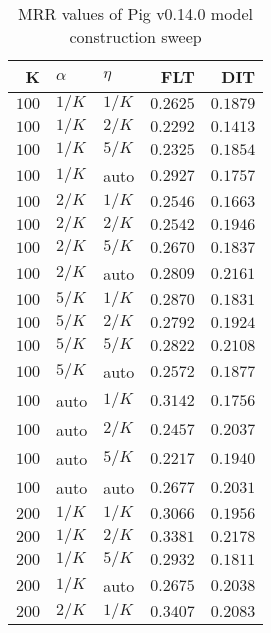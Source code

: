 
\begin{table}
\begin{spacing}{1.2}
\centering
\caption{MRR values of Pig v0.14.0 model construction sweep}
\label{table:pig_model_sweep}
\vspace{0.2em}
\parbox{.45\linewidth}{\centering \begin{tabular}{rll|rr}
\toprule
    K &  $\alpha$ &    $\eta$ & FLT &        DIT \\
\midrule
$100$ &  $1/K$ &  $1/K$ &         $0.2625$ &      $0.1879$ \\
$100$ &  $1/K$ &  $2/K$ &         $0.2292$ &      $0.1413$ \\
$100$ &  $1/K$ &  $5/K$ &         $0.2325$ &      $0.1854$ \\
$100$ &  $1/K$ &   auto &         $0.2927$ &      $0.1757$ \\
$100$ &  $2/K$ &  $1/K$ &         $0.2546$ &      $0.1663$ \\
$100$ &  $2/K$ &  $2/K$ &         $0.2542$ &      $0.1946$ \\
$100$ &  $2/K$ &  $5/K$ &         $0.2670$ &      $0.1837$ \\
$100$ &  $2/K$ &   auto &         $0.2809$ &      $0.2161$ \\
$100$ &  $5/K$ &  $1/K$ &         $0.2870$ &      $0.1831$ \\
$100$ &  $5/K$ &  $2/K$ &         $0.2792$ &      $0.1924$ \\
$100$ &  $5/K$ &  $5/K$ &         $0.2822$ &      $0.2108$ \\
$100$ &  $5/K$ &   auto &         $0.2572$ &      $0.1877$ \\
$100$ &   auto &  $1/K$ &         $0.3142$ &      $0.1756$ \\
$100$ &   auto &  $2/K$ &         $0.2457$ &      $0.2037$ \\
$100$ &   auto &  $5/K$ &         $0.2217$ &      $0.1940$ \\
$100$ &   auto &   auto &         $0.2677$ &      $0.2031$ \\
$200$ &  $1/K$ &  $1/K$ &         $0.3066$ &      $0.1956$ \\
$200$ &  $1/K$ &  $2/K$ &         $0.3381$ &      $0.2178$ \\
$200$ &  $1/K$ &  $5/K$ &         $0.2932$ &      $0.1811$ \\
$200$ &  $1/K$ &   auto &         $0.2675$ &      $0.2038$ \\
$200$ &  $2/K$ &  $1/K$ &         $0.3407$ &      $0.2083$ \\

\end{tabular}}
\end{spacing}
\end{table}
